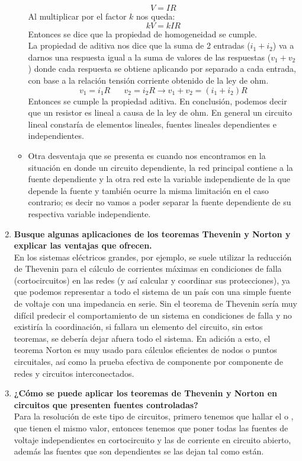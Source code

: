\documentclass[a4paper,11pt]{report}
\begin{document}
\begin{enumerate}[label=\arabic*),font=\bfseries]
\begin{itemize}
$$V = IR
$$
Al multiplicar por el factor $k$ nos queda:
$$
kV = kIR
$$
Entonces se dice que la propiedad de homogeneidad se cumple.\\
La propiedad de aditiva nos dice que la suma de 2 entradas ($i_{1}+i_{2}$) va a darnos una respuesta igual a la suma de valores de las respuestas ($v_{1} + v_{2}$) donde cada respuesta se obtiene aplicando por separado a cada entrada, con base a la relación tensión corriente obtenido de la ley de ohm.
$$
v_{1} = i_{1}R \hspace{20pt} v_{2} = i_{2}R \longrightarrow v_{1} + v_{2} = (i_{1} + i_{2})R
$$
Entonces se cumple la propiedad aditiva. En conclusión, podemos decir que un resistor es lineal a causa de la ley de ohm. En general un circuito lineal constaría de elementos lineales, fuentes lineales dependientes e independientes.
\item Otra desventaja que se presenta es cuando nos encontramos en la situación en donde un circuito dependiente, la red principal contiene a la fuente dependiente y la otra red este la variable independiente de la que depende la fuente y también ocurre la misma limitación en el caso contrario; es decir no vamos a poder separar la fuente dependiente de su respectiva variable independiente.
\end{itemize}
\item \textbf{Busque algunas aplicaciones de los teoremas Thevenin y Norton y explicar las ventajas que ofrecen.}\\
En los sistemas eléctricos grandes, por ejemplo, se suele utilizar la reducción de Thevenin para el cálculo de corrientes máximas en condiciones de falla (cortocircuitos) en las redes (y así calcular y coordinar sus protecciones), ya que podemos representar a todo el sistema de un país con una simple fuente de voltaje con una impedancia en serie. Sin el teorema de Thevenin sería muy difícil predecir el comportamiento de un sistema en condiciones de falla y no existiría la coordinación, si fallara un elemento del circuito, sin estos teoremas, se debería dejar afuera todo el sistema. En adición a esto, el teorema Norton es muy usado para cálculos eficientes de nodos o puntos circuitales, así como la prueba efectiva de componente por componente de redes y circuitos interconectados.
\item \textbf{¿Cómo se puede aplicar los teoremas de Thevenin y Norton en circuitos que presenten fuentes controladas?}\\
Para la resolución de este tipo de circuitos, primero tenemos que hallar el  o , que tienen el mismo valor, entonces tenemos que poner todas las fuentes de voltaje independientes  en cortocircuito y las de corriente en circuito abierto, además las fuentes que son dependientes se las dejan tal como están.\\

\end{enumerate}
\end{document}

